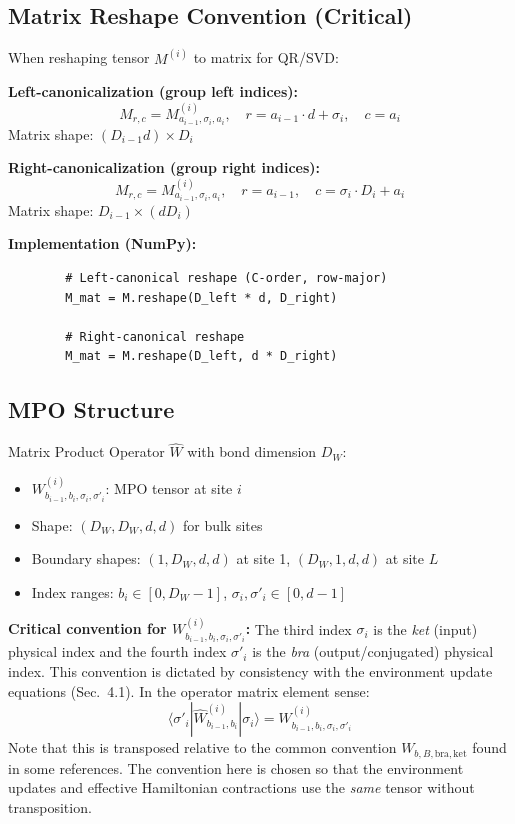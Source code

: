 \documentclass[aps,prb,onecolumn,scriptaddress]{revtex4-2}
\begin{document}
	\subsection{Matrix Reshape Convention (Critical)}
	
	When reshaping tensor $M^{(i)}$ to matrix for QR/SVD:
	
	\textbf{Left-canonicalization (group left indices):}
	\begin{equation}
		M_{r,c} = M^{(i)}_{a_{i-1},\sigma_i,a_i}, \quad r = a_{i-1} \cdot d + \sigma_i, \quad c = a_i
	\end{equation}
	Matrix shape: $(D_{i-1}d) \times D_i$
	
	\textbf{Right-canonicalization (group right indices):}
	\begin{equation}
		M_{r,c} = M^{(i)}_{a_{i-1},\sigma_i,a_i}, \quad r = a_{i-1}, \quad c = \sigma_i \cdot D_i + a_i
	\end{equation}
	Matrix shape: $D_{i-1} \times (dD_i)$
	
	\textbf{Implementation (NumPy):}
	\begin{verbatim}
		# Left-canonical reshape (C-order, row-major)
		M_mat = M.reshape(D_left * d, D_right)
		
		# Right-canonical reshape
		M_mat = M.reshape(D_left, d * D_right)
	\end{verbatim}
	
	\subsection{MPO Structure}
	
	Matrix Product Operator $\hat{W}$ with bond dimension $D_W$:
	\begin{itemize}
		\item $W^{(i)}_{b_{i-1},b_i,\sigma_i,\sigma'_i}$: MPO tensor at site $i$
		\item Shape: $(D_W, D_W, d, d)$ for bulk sites
		\item Boundary shapes: $(1, D_W, d, d)$ at site 1, $(D_W, 1, d, d)$ at site $L$
		\item Index ranges: $b_i \in [0, D_W-1]$, $\sigma_i, \sigma'_i \in [0, d-1]$
	\end{itemize}
	
	\textbf{Critical convention for $W^{(i)}_{b_{i-1},b_i,\sigma_i,\sigma'_i}$:}
	The third index $\sigma_i$ is the \emph{ket} (input) physical index and the fourth index $\sigma'_i$ is the \emph{bra} (output/conjugated) physical index. This convention is dictated by consistency with the environment update equations (Sec.~4.1). In the operator matrix element sense:
	\begin{equation}
		\langle \sigma'_i | \hat{W}^{(i)}_{b_{i-1},b_i} | \sigma_i \rangle = W^{(i)}_{b_{i-1},b_i,\sigma_i,\sigma'_i}
	\end{equation}
	Note that this is transposed relative to the common convention $W_{b,B,\text{bra},\text{ket}}$ found in some references. The convention here is chosen so that the environment updates and effective Hamiltonian contractions use the \emph{same} tensor without transposition.
	
\end{document}
